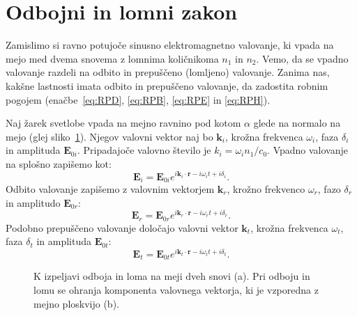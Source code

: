 \section{Odbojni in lomni zakon}
Zamislimo si ravno potujoče sinusno elektromagnetno valovanje, 
ki vpada na mejo med dvema snovema z lomnima količnikoma $n_1$ in $n_2$. 
Vemo, da se vpadno valovanje razdeli na odbito in prepuščeno (lomljeno) 
valovanje. Zanima nas, kakšne lastnosti imata odbito in prepuščeno 
valovanje, da zadostita robnim pogojem (enačbe~\ref{eq:RPD}, \ref{eq:RPB}, 
\ref{eq:RPE} in \ref{eq:RPH}). 

Naj žarek svetlobe vpada na mejno ravnino pod kotom $\alpha$ glede na normalo na mejo (glej
sliko~\ref{fig:04_lom}). Njegov valovni vektor naj bo $\mathbf{k}_i$, 
krožna frekvenca $\omega_i$, faza $\delta_i$ in amplituda $\mathbf{E}_{0i}$. 
Pripadajoče valovno število
je $k_i = \omega_i n_1/c_0$. Vpadno valovanje na splošno zapišemo kot:
\begin{equation}
\mathbf{E}_i = \mathbf{E}_{0i} e^{i\mathbf{k}_i\cdot \mathbf{r} - i \omega_i t + i \delta_i}.
\label{eq:04_06}
\end{equation}
Odbito valovanje zapišemo z valovnim vektorjem $\mathbf{k}_r$, 
krožno frekvenco $\omega_r$, fazo $\delta_r$ in amplitudo $\mathbf{E}_{0r}$: 
\begin{equation}
\mathbf{E}_r = \mathbf{E}_{0r} e^{i\mathbf{k}_r\cdot \mathbf{r} - i \omega_r t + i \delta_r}.
\label{eq:04_07}
\end{equation}
Podobno prepuščeno valovanje določajo valovni vektor $\mathbf{k}_t$, 
krožna frekvenca $\omega_t$, faza $\delta_t$ in amplituda $\mathbf{E}_{0t}$:
\begin{equation}
\mathbf{E}_t = \mathbf{E}_{0t} e^{i\mathbf{k}_t\cdot \mathbf{r} - i \omega_t t + i \delta_t}.
\label{eq:04_08}
\end{equation}
\begin{figure}[!ht]
\centering
\def\svgwidth{130truemm} 

\caption{K izpeljavi odboja in loma na meji dveh snovi (a). Pri odboju in lomu
se ohranja komponenta valovnega vektorja, ki je vzporedna z mejno ploskvijo (b).}
\label{fig:04_lom}
\end{figure}

